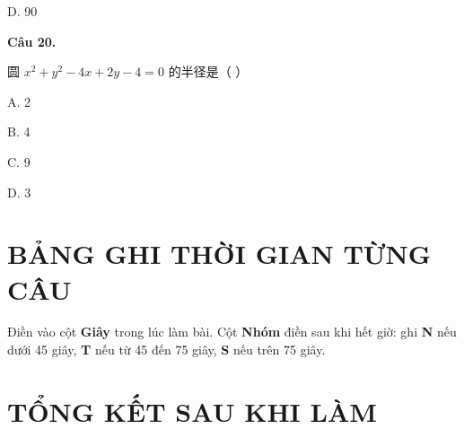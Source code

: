 \documentclass[11pt, a4paper]{article}
\begin{document}
D. 90

\textbf{Câu 20.}

圆 $x^2+y^2-4x+2y-4=0$ 的半径是（ ）

A. 2

B. 4

C. 9

D. 3

\section{BẢNG GHI THỜI GIAN TỪNG CÂU}

Điền vào cột \textbf{Giây} trong lúc làm bài. Cột \textbf{Nhóm} điền sau khi hết giờ: ghi \textbf{N} nếu dưới 45 giây, \textbf{T} nếu từ 45 đến 75 giây, \textbf{S} nếu trên 75 giây.


\section{TỔNG KẾT SAU KHI LÀM}
\end{document}
